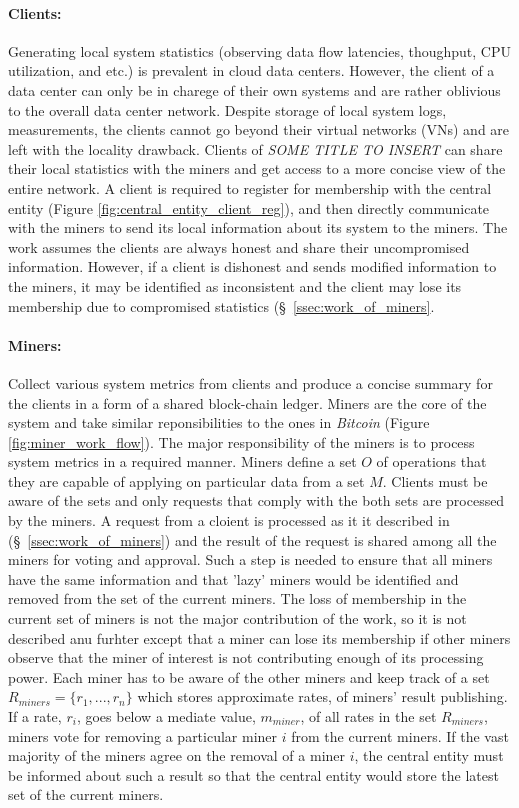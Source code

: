 \documentclass{article}
\newcommand{\projTitle}{SOME TITLE TO INSERT}
\begin{document}
\paragraph{Clients:} Generating local system statistics (observing data flow latencies, thoughput, CPU utilization, and etc.) is prevalent in cloud data centers. However, the client of a data center can only be in charege of their own systems and are rather oblivious to the overall data center network. Despite storage of local system logs, measurements, the clients cannot go beyond their virtual networks (VNs) and are left with the locality drawback. Clients of \textit{\projTitle} can share their local statistics with the miners and get access to a more concise view of the entire network. A client is required to register for membership with the central entity (Figure \ref{fig:central_entity_client_reg}), and then directly communicate with the miners to send its local information about its system to the miners. The work assumes the clients are always honest and share their uncompromised information. However, if a client is dishonest and sends modified information to the miners, it may be identified as inconsistent and the client may lose its membership due to compromised statistics (\S\ \ref{ssec:work_of_miners}.
\par

\paragraph{Miners:} Collect various system metrics from clients and produce a concise summary for the clients in a form of a shared block-chain ledger. Miners are the core of the system and take similar reponsibilities to the ones in \textit{Bitcoin} (Figure \ref{fig:miner_work_flow}). The major responsibility of the miners is to process system metrics in a required manner. Miners define a set $O$ of operations that they are capable of applying on particular data from a set $M$. Clients must be aware of the sets and only
requests that comply with the both sets are processed by the miners. A request from a cloient is processed as it it described in (\S\ \ref{ssec:work_of_miners}) and the result of the request is shared among all the miners for voting and approval. Such a step is needed to
ensure that all miners have the same information and that 'lazy' miners would be identified and removed from the set of the current miners. The loss of membership in the current set of miners is not the major contribution of the work, so it is not described anu furhter except
that a miner can lose its membership if other miners observe that the miner of interest is not contributing enough of its processing power. Each miner has to be aware of the other miners and keep track of a set $R_{miners} = \{r_1, ..., r_n\}$ which stores approximate rates,
of  miners' result publishing. If a rate, $r_i$, goes below a mediate value, $m_{miner}$, of all rates in the set $R_{miners}$, miners vote for removing a particular miner $i$ from the current miners. If the vast majority of the miners agree on the removal of a miner $i$,
the central entity must be informed about such a result so that the central entity would store the latest set of the current miners.
\par
\end{document}
